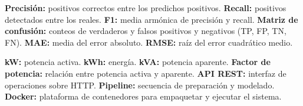 \documentclass[conference]{IEEEtran}
\begin{document}
\textbf{Precisión:} positivos correctos entre los predichos positivos. \textbf{Recall:} positivos detectados entre los reales. \textbf{F1:} media armónica de precisión y recall. \textbf{Matriz de confusión:} conteos de verdaderos y falsos positivos y negativos (TP, FP, TN, FN). \textbf{MAE:} media del error absoluto. \textbf{RMSE:} raíz del error cuadrático medio.

\textbf{kW:} potencia activa. \textbf{kWh:} energía. \textbf{kVA:} potencia aparente. \textbf{Factor de potencia:} relación entre potencia activa y aparente. \textbf{API REST:} interfaz de operaciones sobre HTTP. \textbf{Pipeline:} secuencia de preparación y modelado. \textbf{Docker:} plataforma de contenedores para empaquetar y ejecutar el sistema.
\end{document}
